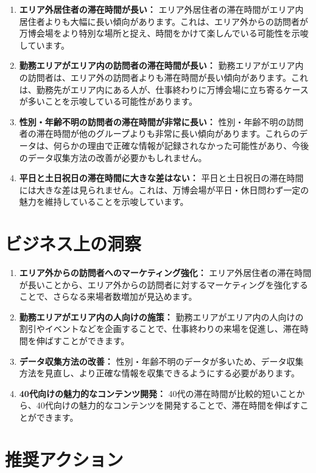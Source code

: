 \documentclass[11pt,a4paper]{article}
\begin{document}
\begin{enumerate}
    \item \textbf{エリア外居住者の滞在時間が長い：} エリア外居住者の滞在時間がエリア内居住者よりも大幅に長い傾向があります。これは、エリア外からの訪問者が万博会場をより特別な場所と捉え、時間をかけて楽しんでいる可能性を示唆しています。
    \item \textbf{勤務エリアがエリア内の訪問者の滞在時間が長い：} 勤務エリアがエリア内の訪問者は、エリア外の訪問者よりも滞在時間が長い傾向があります。これは、勤務先がエリア内にある人が、仕事終わりに万博会場に立ち寄るケースが多いことを示唆している可能性があります。
    \item \textbf{性別・年齢不明の訪問者の滞在時間が非常に長い：} 性別・年齢不明の訪問者の滞在時間が他のグループよりも非常に長い傾向があります。これらのデータは、何らかの理由で正確な情報が記録されなかった可能性があり、今後のデータ収集方法の改善が必要かもしれません。
    \item \textbf{平日と土日祝日の滞在時間に大きな差はない：} 平日と土日祝日の滞在時間には大きな差は見られません。これは、万博会場が平日・休日問わず一定の魅力を維持していることを示唆しています。
\end{enumerate}

\section{ビジネス上の洞察}

\begin{enumerate}
    \item \textbf{エリア外からの訪問者へのマーケティング強化：} エリア外居住者の滞在時間が長いことから、エリア外からの訪問者に対するマーケティングを強化することで、さらなる来場者数増加が見込めます。
    \item \textbf{勤務エリアがエリア内の人向けの施策：} 勤務エリアがエリア内の人向けの割引やイベントなどを企画することで、仕事終わりの来場を促進し、滞在時間を伸ばすことができます。
    \item \textbf{データ収集方法の改善：} 性別・年齢不明のデータが多いため、データ収集方法を見直し、より正確な情報を収集できるようにする必要があります。
    \item \textbf{40代向けの魅力的なコンテンツ開発：} 40代の滞在時間が比較的短いことから、40代向けの魅力的なコンテンツを開発することで、滞在時間を伸ばすことができます。
\end{enumerate}

\section{推奨アクション}
\end{document}
